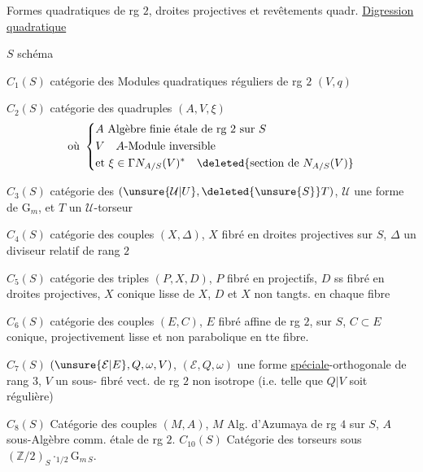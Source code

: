 Formes quadratiques de rg $2$,  droites projectives et revêtements quadr.
\uline{Digression quadratique}

$S$ schéma

$C_1(S)$ catégorie des Modules quadratiques réguliers de rg $2$ $(V,q)$

$C_2(S)$ catégorie des quadruples $(A,V,\xi)$
\[
\text{où }\left\{\begin{aligned}
&A\text{ Algèbre finie étale de rg }2\text{ sur }S\\
&V\quad A\text{-Module inversible}\\
&\text{et }\xi\in\Gamma N_{A/S}(V)^{*}\quad\deleted{\text{section de }N_{A/S}(V)}
\end{aligned}\right.
\]

$C_3(S)$ catégorie des   $(\unsure{\mathcal U|U},\deleted{\unsure{S}}T)$, $\mathcal U$ une  forme de $\mathrm G_m$, et $T$ un $\mathcal U$-torseur

$C_4(S)$ catégorie des couples $(X,\Delta)$, $X$ fibré en droites projectives sur $S$, $\Delta$ un diviseur relatif  de rang $2$

$C_5(S)$ catégorie des triples $(P,X,D)$, $P$ fibré en  projectifs, $D$  ss fibré en droites projectives, $X$ conique lisse de $X$, $D$ et $X$ non tangts. en chaque fibre


$C_6(S)$ catégorie des couples $(E,C)$, $E$ fibré affine de rg $2$, sur $S$, $C\subset E$ conique, projectivement lisse et  non parabolique en tte fibre.

$C_7(S)$  $(\unsure{\mathcal E|E},Q,\omega,V)$,  $(\mathcal E,Q,\omega)$ une forme \uline{spéciale}-orthogonale de rang $3$, $V$ un sous- fibré vect. de rg $2$  non isotrope (i.e. telle que $Q|V$ soit régulière)

$C_8(S)$ Catégorie des couples $(M,A)$, $M$ Alg. d'Azumaya de rg $4$ sur $S$, $A$ sous-Algèbre comm. étale de rg $2$.
$C_{10}(S)$ Catégorie des torseurs sous $(\mathbb Z/2)_S\mathbin{\cdot}_{1/2}\mathrm G_{m\,S}$.

